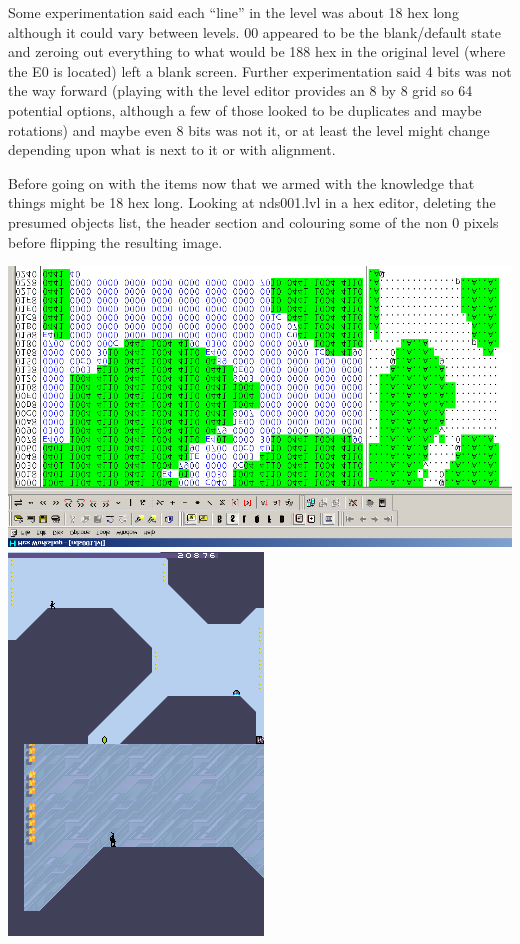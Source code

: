 \documentclass[
]{book}
\begin{document}
Some experimentation said each ``line'' in the level was about 18 hex long although it could vary between levels. 00 appeared to be the blank/default state and zeroing out everything to what would be 188 hex in the original level (where the E0 is located) left a blank screen. Further experimentation said 4 bits was not the way forward (playing with the level editor provides an 8 by 8 grid so 64 potential options, although a few of those looked to be duplicates and maybe rotations) and maybe even 8 bits was not it, or at least the level might change depending upon what is next to it or with alignment.

Before going on with the items now that we armed with the knowledge that things might be 18 hex long. Looking at nds001.lvl in a hex editor, deleting the presumed objects list, the header section and colouring some of the non 0 pixels before flipping the resulting image.

\includegraphics{images/175_home_fast6191_romhackingguide_unrenamed_fil___ers_romhackingguideleveleditingworkedNplus8.png}\includegraphics{images/169_home_fast6191_romhackingguide_unrenamed_fil___ers_romhackingguideleveleditingworkedNplus2.png}
\end{document}
